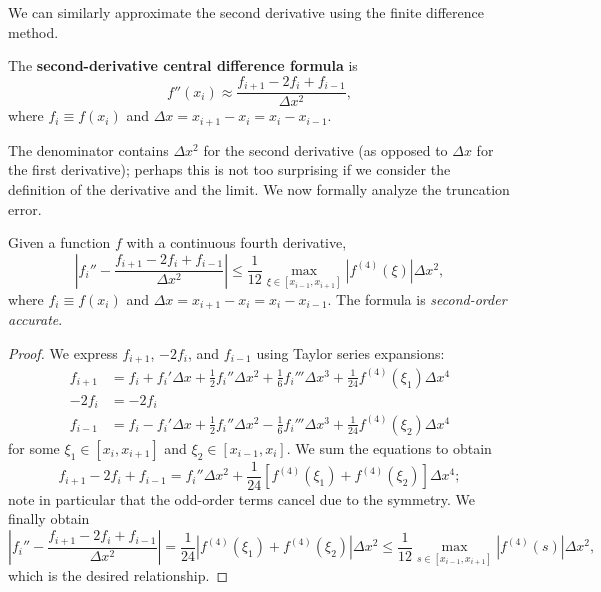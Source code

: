 We can similarly approximate the second derivative using the finite difference method.

\begin{definition}
    The \textbf{second-derivative central difference formula} is
    \begin{equation*}
        f''(x_i) \approx \frac{f_{i+1} - 2f_i + f_{i-1}}{\Delta x^2}, \tag{8.2}
    \end{equation*}
    where $f_i \equiv f(x_i)$ and $\Delta x = x_{i+1} - x_i = x_i - x_{i-1}$.
\end{definition}

The denominator contains $\Delta x^2$ for the second derivative (as opposed to $\Delta x$ for the first derivative); perhaps this is not too surprising if we consider the definition of the derivative and the limit. We now formally analyze the truncation error.

\begin{proposition}[][8.4]
    Given a function $f$ with a continuous fourth derivative,
    \[\left|f_i'' - \frac{f_{i+1} - 2f_i + f_{i-1}}{\Delta x^2}\right| \leq \frac{1}{12} \max_{\xi \in [x_{i-1}, x_{i+1}]} |f^{(4)}(\xi)| \Delta x^2,\]
    where $f_i \equiv f(x_i)$ and $\Delta x = x_{i+1} - x_i = x_i - x_{i-1}$. The formula is \textit{second-order accurate}.
\end{proposition}
\begin{proof}
    We express $f_{i+1}$, $-2f_i$, and $f_{i-1}$ using Taylor series expansions:
    \begin{align*}
        f_{i+1} &= f_i + f_i'\Delta x + \frac{1}{2} f_i''\Delta x^2 + \frac{1}{6} f_i'''\Delta x^3 + \frac{1}{24} f^{(4)}(\xi_1)\Delta x^4 \\
        -2f_i &= -2f_i \\
        f_{i-1} &= f_i - f_i'\Delta x + \frac{1}{2} f_i''\Delta x^2 - \frac{1}{6} f_i'''\Delta x^3 + \frac{1}{24} f^{(4)}(\xi_2)\Delta x^4
    \end{align*}
    for some $\xi_1 \in [x_i, x_{i+1}]$ and $\xi_2 \in [x_{i-1}, x_i]$. We sum the equations to obtain
    \[f_{i+1} - 2f_i + f_{i-1} = f_i''\Delta x^2 + \frac{1}{24} [f^{(4)}(\xi_1) + f^{(4)}(\xi_2)] \Delta x^4;\]
    note in particular that the odd-order terms cancel due to the symmetry. We finally obtain
    \[\left|f_i'' - \frac{f_{i+1} - 2f_i + f_{i-1}}{\Delta x^2}\right| = \frac{1}{24} |f^{(4)}(\xi_1) + f^{(4)}(\xi_2)| \Delta x^2 \leq \frac{1}{12} \max_{s \in [x_{i-1}, x_{i+1}]} |f^{(4)}(s)| \Delta x^2,\]
    which is the desired relationship.
\end{proof}

